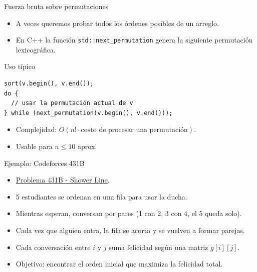 \documentclass[aspectratio=169]{beamer}
\begin{document}
\begin{frame}[fragile]{Fuerza bruta sobre permutaciones}
  \begin{itemize}
    \item A veces queremos probar todos los órdenes posibles de un arreglo.
    \item En C++ la función \texttt{std::next\_permutation} genera la siguiente permutación lexicográfica.
  \end{itemize}
  \begin{block}{Uso típico}
\begin{lstlisting}[style=customc]
sort(v.begin(), v.end());
do {
  // usar la permutación actual de v
} while (next_permutation(v.begin(), v.end()));
\end{lstlisting}
  \end{block}
  \begin{itemize}
    \item Complejidad: \(O(n! \cdot \text{costo de procesar una permutación})\).
    \item Usable para \(n \le 10\) aprox.
  \end{itemize}
\end{frame}

\begin{frame}[fragile]{Ejemplo: Codeforces 431B}
  \begin{itemize}
    \item \href{https://codeforces.com/contest/431/problem/B}{Problema 431B - Shower Line}.
    \item 5 estudiantes se ordenan en una fila para usar la ducha.
    \item Mientras esperan, conversan por pares (1 con 2, 3 con 4, el 5 queda solo).
    \item Cada vez que alguien entra, la fila se acorta y se vuelven a formar parejas.
    \item Cada conversación entre \(i\) y \(j\) suma felicidad según una matriz \(g[i][j]\).
    \item Objetivo: encontrar el orden inicial que maximiza la felicidad total.
  \end{itemize}
\end{frame}
\end{document}

